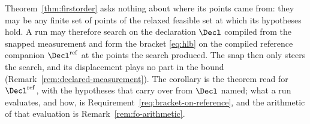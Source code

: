 
Theorem~\ref{thm:firstorder} asks nothing about where its points came from:
they may be any finite set of points of the relaxed feasible set at which its
hypotheses hold. A run may therefore search on the declaration $\Decl$
compiled from the snapped measurement and form the bracket \eqref{eq:hlb} on
the compiled reference companion $\Decl^{\mathrm{ref}}$ at the points the
search produced. The snap then only steers the search, and its displacement
plays no part in the bound
(Remark~\ref{rem:declared-measurement}). The corollary is the theorem read
for $\Decl^{\mathrm{ref}}$, with the hypotheses that carry over from $\Decl$
named; what a run evaluates, and how, is
Requirement~\ref{req:bracket-on-reference}, and the arithmetic of that
evaluation is Remark~\ref{rem:fo-arithmetic}.


